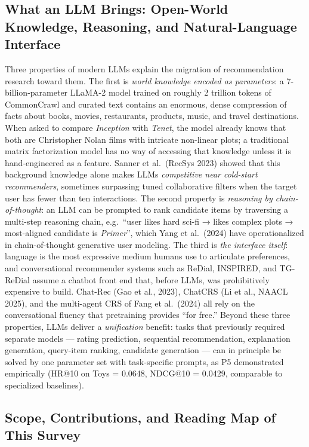 \subsection{What an LLM Brings: Open-World Knowledge, Reasoning, and Natural-Language Interface}\label{what-an-llm-brings-open-world-knowledge-reasoning-and-natural-language-interface}

Three properties of modern LLMs explain the migration of recommendation research toward them. The first is \emph{world knowledge encoded as parameters}: a 7-billion-parameter LLaMA-2 model trained on roughly 2 trillion tokens of CommonCrawl and curated text contains an enormous, dense compression of facts about books, movies, restaurants, products, music, and travel destinations. When asked to compare \emph{Inception} with \emph{Tenet}, the model already knows that both are Christopher Nolan films with intricate non-linear plots; a traditional matrix factorization model has no way of accessing that knowledge unless it is hand-engineered as a feature. Sanner et al.~(RecSys 2023) showed that this background knowledge alone makes LLMs \emph{competitive near cold-start recommenders}, sometimes surpassing tuned collaborative filters when the target user has fewer than ten interactions. The second property is \emph{reasoning by chain-of-thought}: an LLM can be prompted to rank candidate items by traversing a multi-step reasoning chain, e.g.~``user likes hard sci-fi → likes complex plots → most-aligned candidate is \emph{Primer}'', which Yang et al.~(2024) have operationalized in chain-of-thought generative user modeling. The third is \emph{the interface itself}: language is the most expressive medium humans use to articulate preferences, and conversational recommender systems such as ReDial, INSPIRED, and TG-ReDial assume a chatbot front end that, before LLMs, was prohibitively expensive to build. Chat-Rec (Gao et al., 2023), ChatCRS (Li et al., NAACL 2025), and the multi-agent CRS of Fang et al.~(2024) all rely on the conversational fluency that pretraining provides ``for free.'' Beyond these three properties, LLMs deliver a \emph{unification} benefit: tasks that previously required separate models --- rating prediction, sequential recommendation, explanation generation, query-item ranking, candidate generation --- can in principle be solved by one parameter set with task-specific prompts, as P5 demonstrated empirically (HR@10 on Toys = 0.0648, NDCG@10 = 0.0429, comparable to specialized baselines).

\subsection{Scope, Contributions, and Reading Map of This Survey}\label{scope-contributions-and-reading-map-of-this-survey}

